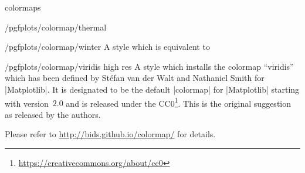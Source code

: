 \begin{pgfplotslibrary}{colormaps}
\begin{stylekey}{/pgfplots/colormap/thermal}

	\matlabcolormaptext
\end{stylekey}

\begin{stylekey}{/pgfplots/colormap/winter}
	A style which is equivalent to 
\begin{codeexample}
\end{codeexample}


	\matlabcolormaptext
\end{stylekey}

\begin{stylekey}{/pgfplots/colormap/viridis high res}
	A style which installs the colormap ``viridis'' which has been defined by St\'efan van der Walt and Nathaniel Smith for |Matplotlib|. It is designated to be the default |colormap| for |Matplotlib| starting with version~$2.0$ and is released under the CC0\footnote{\url{https://creativecommons.org/about/cc0}}. This is the original suggestion as released by the authors.

	Please refer to \url{http://bids.github.io/colormap/} for details.

\begin{codeexample}
\pgfplotsset{
	colormap name=viridis,
}
\end{codeexample}

\begin{codeexample}
\pgfplotsset{
	colormap/viridis high res,
}
\end{codeexample}
\end{stylekey}

\end{pgfplotslibrary}
\endgroup
